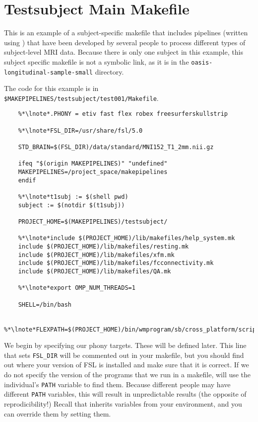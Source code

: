 \section{Testsubject Main Makefile}
\def\sectionautorefname{Testsubject Main Makefile}
\label{sec:testsubjectxfm}

This is an example of a subject-specific makefile that includes
pipelines (written using \maken{}) that have been developed by several people to process different types of
subject-level MRI data. Because there is only one subject in
this example, this subject specific makefile is not a symbolic link,
as it is in the \texttt{oasis-longitudinal-sample-small} directory. 

The code for this example is in \texttt{\$MAKEPIPELINES/testsubject/test001/Makefile}. 

\setcounter{codehighlight}{0} %
\begin{lstlisting}
	%*\lnote*.PHONY = etiv fast flex robex freesurferskullstrip 

	%*\lnote*FSL_DIR=/usr/share/fsl/5.0 

	STD_BRAIN=$(FSL_DIR)/data/standard/MNI152_T1_2mm.nii.gz 

	ifeq "$(origin MAKEPIPELINES)" "undefined"
	MAKEPIPELINES=/project_space/makepipelines 
	endif 

	%*\lnote*t1subj := $(shell pwd) 
	subject := $(notdir $(t1subj)) 

	PROJECT_HOME=$(MAKEPIPELINES)/testsubject/

	%*\lnote*include $(PROJECT_HOME)/lib/makefiles/help_system.mk 
	include $(PROJECT_HOME)/lib/makefiles/resting.mk 
	include $(PROJECT_HOME)/lib/makefiles/xfm.mk 
	include $(PROJECT_HOME)/lib/makefiles/fcconnectivity.mk 
	include $(PROJECT_HOME)/lib/makefiles/QA.mk 

	%*\lnote*export OMP_NUM_THREADS=1 

	SHELL=/bin/bash 

	%*\lnote*FLEXPATH=$(PROJECT_HOME)/bin/wmprogram/sb/cross_platform/scripts

\end{lstlisting}

 We begin by specifying our phony targets. These will be
defined later. 
 This line that sets \texttt{FSL_DIR} will be commented out in
your makefile, but you should find out where your version of FSL is
installed and make sure that it is correct. If we do not specify the
version of the programs that we run in a makefile, \maken{} will use
the individual's \texttt{PATH} variable to find them. Because
different people may have different \texttt{PATH} variables, this will
result in unpredictable results (the opposite of reprodicibility!)
Recall that \maken{} inherits variables from your environment, and you
can override them by setting them.

